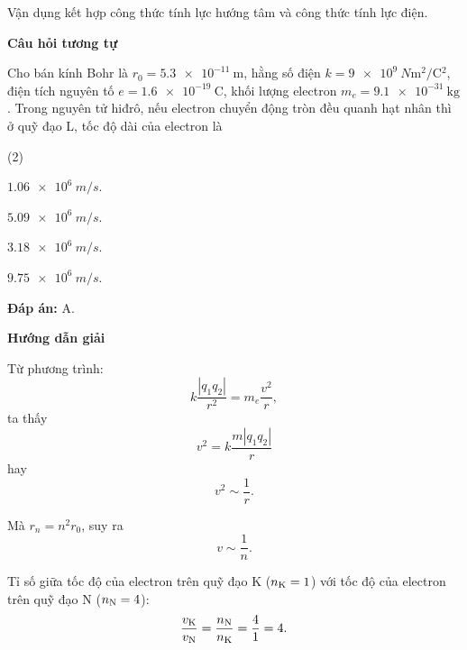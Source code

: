 \begin{dang}{Vận dụng kết hợp công thức tính lực hướng tâm và công thức tính lực điện.}
{		\begin{center}
			\textbf{Câu hỏi tương tự}
		\end{center}
		
		Cho bán kính Bohr là $r_0=\SI{5.3e-11}{\meter}$, hằng số điện $k=\SI{9e9}{N \meter ^2 / \coulomb ^2}$, điện tích nguyên tố $e=\SI{1.6e-19}{\coulomb}$, khối lượng electron $m_e=\SI{9.1e-31}{\kilogram}$. Trong nguyên tử hiđrô, nếu electron chuyển động tròn đều quanh hạt nhân thì ở quỹ đạo L, tốc độ dài của electron là
		\begin{mcq}(2)
			\item $ \SI{1,06 e6}{m/s} $.
			\item $ \SI{5,09 e6}{m/s} $.
			\item $ \SI{3,18 e6}{m/s} $.
			\item $ \SI{9,75 e6}{m/s} $.
		\end{mcq}	
		
		\textbf{Đáp án:} A.}
	
	{	\begin{center}
			\textbf{Hướng dẫn giải}
		\end{center}
		
		Từ phương trình:
		\begin{equation*}
			k \dfrac {|q_1q_2|}{r^2} = m_e \dfrac{v^2}{r},
		\end{equation*}
		ta thấy
		\begin{equation*}
			v^2 = k\dfrac{m|q_1q_2|}{r}
		\end{equation*}
		hay
		\begin{equation*}
			v^2 \sim \dfrac{1}{r}.
		\end{equation*}
		
		Mà $r_n =n ^2 r_0$, suy ra
		\begin{equation*}
			v \sim \dfrac{1}{n}.
		\end{equation*}
		
		Tỉ số giữa tốc độ của electron trên quỹ đạo K ($n_\text K = 1$) với tốc độ của electron trên quỹ đạo N ($n_\text N= 4$):
		\begin{equation*}
			\dfrac{v_\text K}{v_\text N} = \dfrac{n_\text N}{n_\text K}=\dfrac{4}{1}=4.
		\end{equation*}
		
}
\end{dang}
